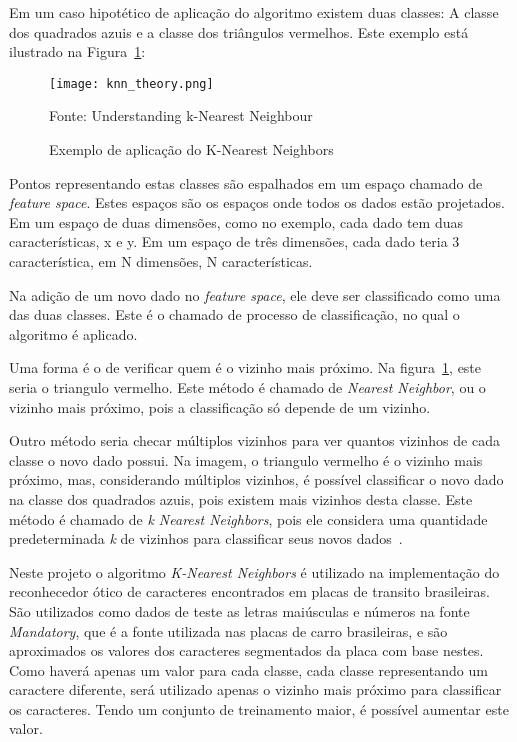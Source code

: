 Em um caso hipotético de aplicação do algoritmo existem duas classes: A classe
dos quadrados azuis e a classe dos triângulos vermelhos. Este exemplo está
ilustrado na Figura~\ref{fig:knearest_example}:

\begin{figure}[H]
	\centering
	\texttt{[image: knn\_theory.png]}
	\caption{Exemplo de aplicação do K-Nearest Neighbors}
Fonte: Understanding k-Nearest Neighbour~\cite{opencv2014knearest}
	\label{fig:knearest_example}
\end{figure}

Pontos representando estas classes são espalhados em um espaço chamado de
\emph{feature space}. Estes espaços são os espaços onde todos os dados estão
projetados. Em um espaço de duas dimensões, como no exemplo, cada dado tem duas
características, x e y. Em um espaço de três dimensões, cada dado teria 3
característica, em N dimensões, N características.

Na adição de um novo dado no \emph{feature space}, ele deve ser classificado
como uma das duas classes. Este é o chamado de processo de classificação, no
qual o algoritmo é aplicado.

Uma forma é o de verificar quem é o vizinho mais próximo. Na
figura~\ref{fig:knearest_example}, este seria o triangulo vermelho. Este método
é chamado de \emph{Nearest Neighbor}, ou o vizinho mais próximo, pois a
classificação só depende de um vizinho.

Outro método seria checar múltiplos vizinhos para ver quantos vizinhos de cada
classe o novo dado possui. Na imagem, o triangulo vermelho é o vizinho mais
próximo, mas, considerando múltiplos vizinhos, é possível classificar o novo
dado na classe dos quadrados azuis, pois existem mais vizinhos desta classe.
Este método é chamado de \emph{k Nearest Neighbors}, pois ele considera uma
quantidade predeterminada \emph{k} de vizinhos para classificar seus novos
dados~\cite{opencv2014knearest}.

Neste projeto o algoritmo \emph{K-Nearest Neighbors} é utilizado na
implementação do reconhecedor ótico de caracteres encontrados em placas de
transito brasileiras. São utilizados como dados de teste as letras maiúsculas e
números na fonte \emph{Mandatory}, que é a fonte utilizada nas placas de carro
brasileiras, e são aproximados os valores dos caracteres segmentados da placa
com base nestes. Como haverá apenas um valor para cada classe, cada classe
representando um caractere diferente, será utilizado apenas o vizinho mais
próximo para classificar os caracteres. Tendo um conjunto de treinamento maior,
é possível aumentar este valor.

